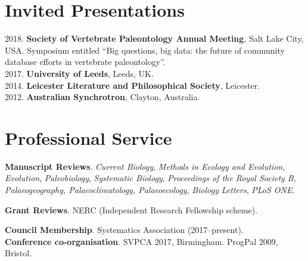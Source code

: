 \documentclass[a4paper, oneside, final]{scrartcl} %
\begin{document}
\begin{center}
\begin{flushleft}
\section{Invited Presentations}
\begin{flushleft}
2018. \textbf{Society of Vertebrate Paleontology Annual Meeting}, Salt Lake City, USA. Symposium entitled ``Big questions, big data: the future of community database efforts in vertebrate paleontology''.\\
2017. \textbf{University of Leeds}, Leeds, UK.\\
2014. \textbf{Leicester Literature and Philosophical Society}, Leicester.\\
2012. \textbf{Australian Synchrotron}, Clayton, Australia.\\
\end{flushleft}



\section{Professional Service}

\begin{flushleft}

\textbf{Manuscript Reviews}. \emph{Current Biology}, \emph{Methods in Ecology and Evolution}, \emph{Evolution}, \emph{Paleobiology}, \emph{Systematic Biology}, \emph{Proceedings of the Royal Society B}, \emph{Palaeogeography, Palaeoclimatology, Palaeoecology}, \emph{Biology Letters}, \emph{PLoS ONE}.
\vspace{6Pt}

\textbf{Grant Reviews}. NERC (Independent Research Fellowship scheme).
\vspace{6Pt}

\textbf{Council Membership}. Systematics Association (2017--present).\\
\vspace{6Pt}
\textbf{Conference co-organisation}. SVPCA 2017, Birmingham. ProgPal 2009, Bristol.

\end{flushleft}



\end{flushleft}
\end{center}
\end{document}
